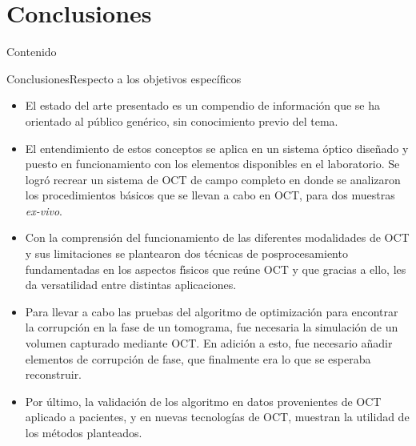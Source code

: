 \documentclass[fleqn,10pt]{beamer}
\begin{document}
\section{Conclusiones}
\begin{frame}{Contenido}
	\tableofcontents[currentsection]
\end{frame}
\begin{frame}{Conclusiones}{Respecto a los objetivos específicos}
	
		{\footnotesize \begin{itemize}
			\item<1-> El {\color{green}estado del arte presentado} es un compendio de información que se ha orientado al público genérico, sin conocimiento previo del tema.
			
			\item<2-> El entendimiento de estos conceptos se aplica en un {\color{blue}sistema óptico} diseñado y puesto en funcionamiento con los elementos disponibles en el laboratorio. Se logró recrear un sistema de OCT de campo completo en donde se analizaron los procedimientos básicos que se llevan a cabo en OCT, para dos muestras \emph{ex-vivo}.
			
			\item<3-> Con la comprensión del funcionamiento de las diferentes modalidades de OCT y sus limitaciones se plantearon {\color{violet}dos técnicas de posprocesamiento} fundamentadas en los aspectos fı́sicos que reúne OCT y que gracias a ello, les da versatilidad entre distintas aplicaciones.
			
			\item<4-> Para llevar a cabo las pruebas del algoritmo de optimización para encontrar la corrupción en la fase de un tomograma, fue necesaria {\color{red}la simulación} de un volumen capturado mediante OCT. En adición a esto, fue necesario añadir elementos de corrupción de fase, que finalmente era lo que se esperaba reconstruir.
			
			\item<5-> Por último, la {\color{magenta}validación de los algoritmo} en datos provenientes de OCT aplicado	a pacientes, y en nuevas tecnologías de OCT, muestran la utilidad de los métodos planteados.
		\end{itemize}}
	

\end{frame}
\end{document}
